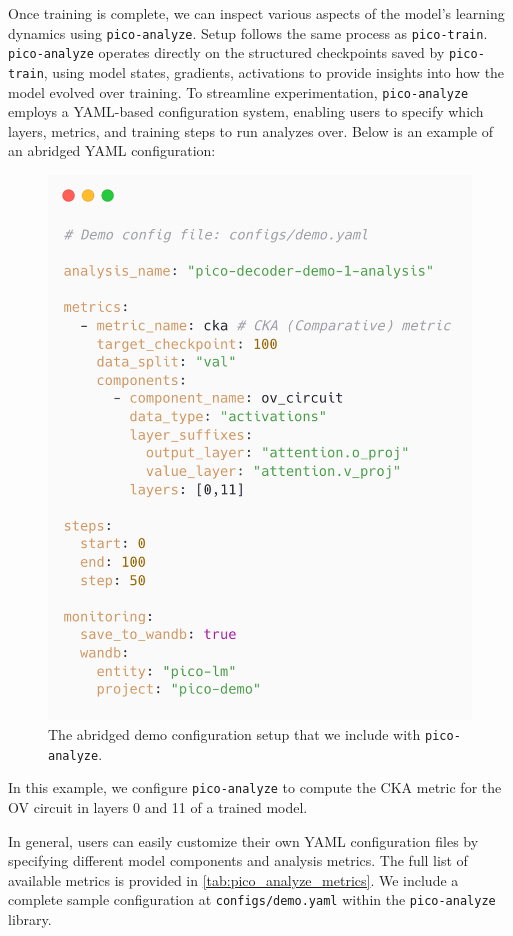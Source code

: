 {Once training is complete, we can inspect various aspects of the model's learning dynamics using \texttt{pico-analyze}. Setup follows the same process as \texttt{pico-train}. \texttt{pico-analyze} operates directly on the structured checkpoints saved by \texttt{pico-train}, using model states, gradients, activations to provide insights into how the model evolved over training. To streamline experimentation, \texttt{pico-analyze} employs a YAML-based configuration system, enabling users to specify which layers, metrics, and training steps to run analyzes over. Below is an example of an abridged YAML configuration:

\begin{figure}[h!] 
    \centering
    \includegraphics[width=0.7\columnwidth]{chapters/pico/figures/demo/demo_config_analyze.png}
    \caption{The abridged demo configuration setup that we include with \texttt{pico-analyze}.}
    \label{fig:demo_analysis_config}
\end{figure}

In this example, we configure \texttt{pico-analyze} to compute the CKA metric for the OV circuit in layers 0 and 11 of a trained model.

In general, users can easily customize their own YAML configuration files by specifying different model components and analysis metrics. The full list of available metrics is provided in \cref{tab:pico_analyze_metrics}. We include a complete sample configuration at \texttt{configs/demo.yaml} within the \texttt{pico-analyze} library.

}
